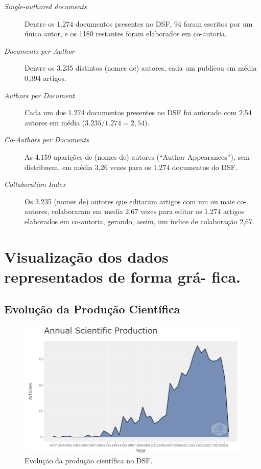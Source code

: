 \begin{description}
    \item [\textit{Single-authored documents}] Dentre os 1.274 documentos presentes no DSF, 94 foram escritos por um único autor, e os 1180 restantes foram elaborados em co-autoria.
    
    \item [\textit{Documents per Author}] Dentre os 3.235 distintos (nomes de) autores, cada um publicou em média 0,394 artigos.
    
    \item [\textit{Authors per Document}] Cada um dos 1.274 documentos presentes no DSF foi autorado com 2,54 autores em média ($3.235 / 1.274 = 2,54$).
    
    \item [\textit{Co-Authors per Documents}] As 4.159 aparições de (nomes de) autores (``Author Appearances''), sem distribuem, em média 3,26 vezes para os 1.274 documentos do DSF.
    
    \item [\textit{Collaboration Index}] Os 3.235 (nomes de) autores que editaram artigos com um ou mais co-autores, colaboraram em media 2,67 vezes para editar os 1.274 artigos elaborados em co-autoria, gerando, assim, um índice de colaboração 2,67. 
\end{description}
\newpage

\section{Visualização dos dados representados de forma grá-
fica.}


\subsection{Evolução da Produção Científica}

\begin{figure}
    \centering
    \includegraphics[width=1\textwidth]{experiments/MoustacheGolem/T1/img1AnnualScientifiProduction.PNG}%
    \caption{Evolução da produção científica no DSF.}
    \label{fig:evol:anual:DSF@MoustacheGolem}
\end{figure}


